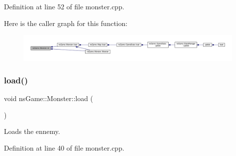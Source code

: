 Definition at line 52 of file monster.\+cpp.

Here is the caller graph for this function\+:\nopagebreak
\begin{figure}[H]
\begin{center}
\leavevmode
\includegraphics[width=350pt]{classns_game_1_1_monster_a14a0c542fe9c8b6772a3984ed674c9cf_icgraph}
\end{center}
\end{figure}
\mbox{\label{classns_game_1_1_monster_a6b81ba26c3e8fae426e719be2acc4e4e}} 
\subsubsection{\texorpdfstring{load()}{load()}}
{\footnotesize\ttfamily void ns\+Game\+::\+Monster\+::load (\begin{DoxyParamCaption}{ }\end{DoxyParamCaption})}



Loads the ennemy. 



Definition at line 40 of file monster.\+cpp.

